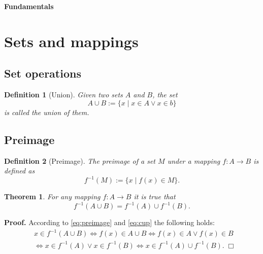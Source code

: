 \documentclass[a4paper,fleqn,11pt]{scrartcl}
\newcommand{\strong}[1]{\textsf{\textbf{#1}}}
\theoremstyle{rmbox}
\newtheorem{definition}{Definition}
\newtheorem{theorem}{Theorem}
\begin{document}
\thispagestyle{empty}

\noindent
{\huge\strong{Fundamentals}}

\tableofcontents

\section{Sets and mappings}

\subsection{Set operations}

\begin{definition}[Union]
Given two sets $A$ and $B$, the set
\begin{equation}\label{eq:cup}
A\cup B := \{x\mid x\in A\lor x\in b\}
\end{equation}
is called the \emph{union} of them.
\end{definition}


\subsection{Preimage}

\begin{definition}[Preimage]
The \emph{preimage} of a set $M$ under a mapping
$f\colon A\to B$ is defined as
\begin{equation}\label{eq:preimage}
f^{-1}(M) := \{x\mid f(x)\in M\}.
\end{equation}
\end{definition}

\begin{theorem}
For any mapping $f\colon A\to B$ it is true that
\begin{equation}
f^{-1}(A\cup B) = f^{-1}(A)\cup f^{-1}(B).
\end{equation}
\end{theorem}

\noindent
\strong{Proof.} According to \eqref{eq:preimage} and \eqref{eq:cup}
the following holds:
\begin{align}
&x\in f^{-1}(A\cup B)\iff f(x)\in A\cup B
\iff f(x)\in A\lor f(x)\in B\\
&\iff x\in f^{-1}(A)\lor x\in f^{-1}(B)
\iff x\in f^{-1}(A)\cup f^{-1}(B).\;\Box
\end{align}
\end{document}

